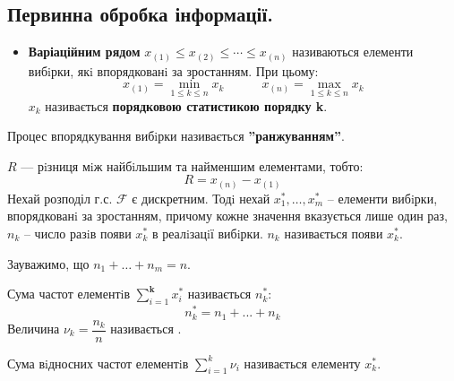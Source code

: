 \subsection{Первинна обробка інформації.}
\begin{itemize}
    \item \textbf{\color{javared}Варіаційним рядом} $x_{(1)} \leq x_{(2)} \leq \cdots \leq x_{(n)} $ називаються елементи вибiрки, якi
впорядкованi за зростанням. При цьому:
$$
x_{(1)} = \min\limits_{1 \leq k \leq n} x_k \qquad \quad x_{(n)} = \max\limits_{1 \leq k \leq n} x_k
$$
$x_k$ називається \textbf{\color{javadocblue}порядковою статистикою порядку k}.
\end{itemize}
Процес впорядкування вибiрки називається \textbf{\color{javadocblue}''ранжуванням''}.\par
{} $R$ --- рiзниця мiж найбiльшим та найменшим елементами, тобто:
$$
R = x_{(n)} - x_{(1)}
$$
Нехай розподіл г.с. $\mathcal{F}$ є дискретним. Тодi нехай $x_1^* , \dots , x_m^*$ – елементи вибiрки, впорядкованi
за зростанням, причому кожне значення вказується лише один раз, $n_k$ – число разiв появи $x_k^*$ в реалiзацiї вибiрки.  $n_k$ називається  появи $x_k^*$.\par
Зауважимо, що $n_1 + \dots + n_m = n$.\par
Сума частот елементiв $ \displaystyle\sum\limits_{i = 1}^{ \textbf{k}}{x_i^*}$ називається  $n_k^*$:
$$
n_k^* = n_1 + ... + n_k
$$
Величина $\nu_k = \dfrac{n_k}{n}$ називається .\par
Сума вiдносних частот елементiв $\displaystyle  \sum\limits_{i = 1}^{k}{ \nu_i}$ називається  елементу $x_k^*$.\par
\newpage
